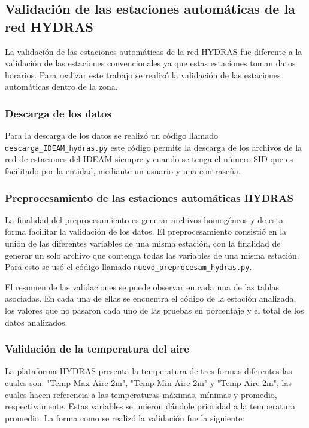 \documentclass[11pt]{article}
\begin{document}
\subsection{Validación de las estaciones automáticas de la red HYDRAS}

La validación de las estaciones automáticas de la red HYDRAS fue diferente a la validación de las estaciones convencionales ya que estas estaciones toman datos horarios. Para realizar este trabajo se realizó la validación de las estaciones automáticas dentro de la zona.

\subsubsection{Descarga de los datos}
Para la descarga de los datos se realizó un código llamado \texttt{descarga\_IDEAM\_hydras.py} este código permite la descarga de los archivos de la red de estaciones del IDEAM siempre y cuando se tenga el número SID que es facilitado por la entidad, mediante un usuario y una contraseña.

\subsubsection{Preprocesamiento de las estaciones automáticas HYDRAS}

La finalidad del preprocesamiento es generar archivos homogéneos y de esta forma facilitar la validación de los datos. El preprocesamiento consistió en la unión de las diferentes variables de una misma estación, con la finalidad de generar un solo archivo que contenga todas las variables de una misma estación. Para esto se usó el código llamado \texttt{nuevo\_preprocesam\_hydras.py}.

El resumen de las validaciones se puede observar en cada una de las tablas asociadas. En cada una de ellas se encuentra el código de la estación analizada, los valores que no pasaron cada uno de las pruebas en porcentaje y el total de los datos analizados.

\subsubsection{Validación de la temperatura del aire}

La plataforma HYDRAS presenta la temperatura de tres formas diferentes las cuales son: "Temp Max Aire 2m", "Temp Min Aire 2m" y "Temp Aire 2m", las cuales hacen referencia a las temperaturas máximas, mínimas y promedio, respectivamente. Estas variables se unieron dándole prioridad a la temperatura promedio. La forma como se realizó la validación fue la siguiente:
\end{document}
